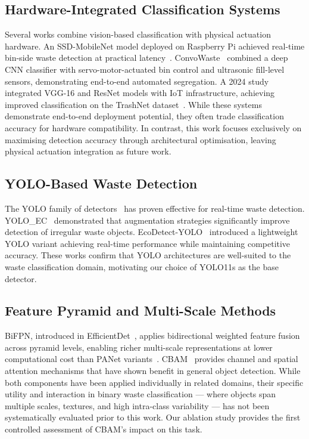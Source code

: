 \documentclass[runningheads]{llncs}
\begin{document}
\subsection{Hardware-Integrated Classification Systems}

Several works combine vision-based classification with physical
actuation hardware. An SSD-MobileNet model deployed on Raspberry Pi
achieved real-time bin-side waste detection at practical
latency~\cite{ssd_mobilenet2021}. ConvoWaste~\cite{convowaste2023}
combined a deep CNN classifier with servo-motor-actuated bin control
and ultrasonic fill-level sensors, demonstrating end-to-end automated
segregation. A 2024 study integrated VGG-16 and ResNet models with
IoT infrastructure, achieving improved classification on the TrashNet
dataset~\cite{iot_ai2024}. While these systems demonstrate
end-to-end deployment potential, they often trade classification
accuracy for hardware compatibility. In contrast, this work focuses
exclusively on maximising detection accuracy through architectural
optimisation, leaving physical actuation integration as future work.

\subsection{YOLO-Based Waste Detection}

The YOLO family of detectors~\cite{redmon2016yolo} has proven effective for real-time
waste detection. YOLO\_EC~\cite{yolo_ec} demonstrated that
augmentation strategies significantly improve detection of irregular
waste objects. EcoDetect-YOLO~\cite{ecodetect} introduced a
lightweight YOLO variant achieving real-time performance while
maintaining competitive accuracy. These works confirm that YOLO
architectures are well-suited to the waste classification domain,
motivating our choice of YOLO11s as the base detector.

\subsection{Feature Pyramid and Multi-Scale Methods}

BiFPN, introduced in EfficientDet~\cite{tan2020efficientdet},
applies bidirectional weighted feature fusion across pyramid levels,
enabling richer multi-scale representations at lower computational
cost than PANet variants~\cite{liu2018panet}. CBAM~\cite{woo2018cbam} provides channel
and spatial attention mechanisms that have shown benefit in general
object detection. While both components have been applied individually
in related domains, their specific utility and interaction in binary
waste classification — where objects span multiple scales, textures,
and high intra-class variability — has not been systematically
evaluated prior to this work. Our ablation study provides the first
controlled assessment of CBAM's impact on this task.
\end{document}
